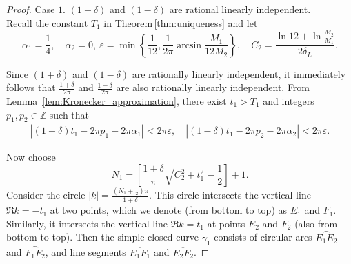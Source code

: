 \documentclass[11pt,reqno]{amsart}
\theoremstyle{definition}
\theoremstyle{remark}
\numberwithin{equation}{section}
\begin{document}
\begin{proof}

Case $1$. $(1+\delta)$ and $(1-\delta)$ are rational linearly independent.\\
Recall the constant $T_1$ in Theorem\,\ref{thm:uniqueness} and let
\begin{equation}\label{eq:C1 independent set up notations}
		\alpha_1=\frac{1}{4}, \quad \alpha_2=0,~\varepsilon=\min{\left\{\frac{1}{12},\frac{1}{2\pi}\arcsin{\frac{M_1}{12M_2}}\right\}}, \quad C_2=\frac{\ln{12}+\ln{\frac{M_2}{M_1}}}{2\delta_L}.
\end{equation}


Since $(1+\delta)$ and $(1-\delta)$ are rationally linearly independent, it immediately follows that $\frac{1+\delta}{2\pi}$ and $\frac{1-\delta}{2\pi}$ are also rationally linearly independent. From Lemma~\ref{lem:Kronecker_approximation}, there exist $t_1 > T_1$ and integers $p_1, p_2 \in \mathbb{Z}$ such that
\begin{eqnarray}\label{eq:C1 independent Kronecker angle estimation}
		\left|\left(1+\delta\right)t_1-2\pi p_1-2\pi\alpha_1\right|<2\pi\varepsilon, \quad
		 \left|\left(1-\delta\right)t_1-2\pi p_2-2\pi\alpha_2 \right|<2\pi\varepsilon.
\end{eqnarray}

Now choose
\begin{equation*}
		N_1=\left[\frac{1+\delta}{\pi}\sqrt{C_2^2+t_1^2}-\frac{1}{2}\right]+1.
\end{equation*}
Consider the circle $|k| = \frac{(N_1 + \frac{1}{2})\pi}{1+\delta}$. This circle intersects the vertical line $\Re k = -t_1$ at two points, which we denote (from bottom to top) as $E_1$ and $F_1$. Similarly, it intersects the vertical line $\Re k = t_1$ at points $E_2$ and $F_2$ (also from bottom to top). Then the simple closed curve $\gamma_1$ consists of circular arcs $\stackrel{\frown}{E_1E_2}$ and $\stackrel{\frown}{F_1F_2}$, and line segments $\overline{E_1F_1}$ and $\overline{E_2F_2}$.


\end{proof}
\end{document}
